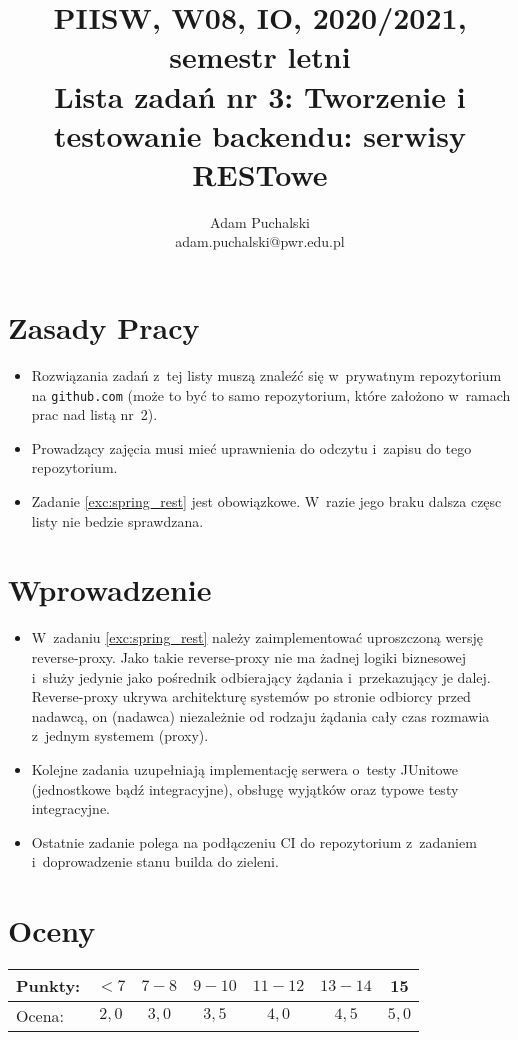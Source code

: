 \documentclass[12pt]{article}
\title{PIISW, W08, IO, 2020/2021, semestr letni\\Lista zadań nr 3: Tworzenie i testowanie backendu: serwisy RESTowe}
\author{Adam Puchalski\\ \small adam.puchalski@pwr.edu.pl}
\begin{document}
    \maketitle

    \section*{Zasady Pracy}
    \begin{itemize}
        \item Rozwiązania zadań z~tej listy muszą znaleźć się w~prywatnym repozytorium na \texttt{github.com} (może to być to samo repozytorium, które założono w~ramach prac nad listą nr~2).
        \item Prowadzący zajęcia musi mieć uprawnienia do odczytu i~zapisu do tego repozytorium.
        \item Zadanie \ref{exc:spring_rest} jest obowiązkowe. W~razie jego braku dalsza częsc listy nie bedzie sprawdzana.
    \end{itemize}

\section*{Wprowadzenie}
\begin{itemize}
        \item  W~zadaniu \ref{exc:spring_rest} należy zaimplementować uproszczoną wersję reverse-proxy. Jako takie reverse-proxy nie ma żadnej logiki biznesowej i~służy jedynie jako pośrednik odbierający żądania i~przekazujący je dalej. Reverse-proxy ukrywa architekturę systemów po stronie odbiorcy przed nadawcą, on (nadawca) niezależnie od rodzaju żądania cały czas rozmawia z~jednym systemem (proxy).
        \item Kolejne zadania uzupełniają implementację serwera o~testy JUnitowe (jednostkowe bądź integracyjne), obsługę wyjątków oraz typowe testy integracyjne.
        \item Ostatnie zadanie polega na podłączeniu CI do repozytorium z~zadaniem i~doprowadzenie stanu builda do zieleni.
\end{itemize}

    \section*{Oceny}
    \begin{tabular}{|l|c|c|c|c|c|c|}
        \hline
        Punkty: & $<7$ & $7-8$ & $9-10$ & $11-12$ & $13-14$ & 15\\
        \hline
        Ocena:  & $2,0$ & $3,0$ & $3,5$ & $4,0$ & $4,5$ & $5,0$\\
        \hline
    \end{tabular}
\end{document}
